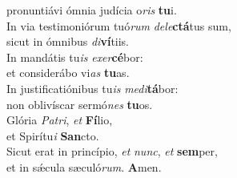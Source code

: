 \oddverse pronuntiávi ómnia judícia o\textit{ris} \textbf{tu}i.\\
\evenverse In via testimoniórum tuó\textit{rum} \textit{de}\textit{le}\textbf{ctá}tus sum,~\*\\
\evenverse sicut in ómnibus \textit{di}\textbf{ví}tiis.\\
\oddverse In mandátis tu\textit{is} \textit{e}\textit{xer}\textbf{cé}bor:~\*\\
\oddverse et considerábo vi\textit{as} \textbf{tu}as.\\
\evenverse In justificatiónibus tu\textit{is} \textit{me}\textit{di}\textbf{tá}bor:~\*\\
\evenverse non oblivíscar sermó\textit{nes} \textbf{tu}os.\\
\oddverse Glória \textit{Pa}\textit{tri}, \textit{et} \textbf{Fí}lio,~\*\\
\oddverse et Spirítu\textit{i} \textbf{San}cto.\\
\evenverse Sicut erat in princípio, \textit{et} \textit{nunc}, \textit{et} \textbf{sem}per,~\*\\
\evenverse et in sǽcula sæculó\textit{rum}. \textbf{A}men.\\

